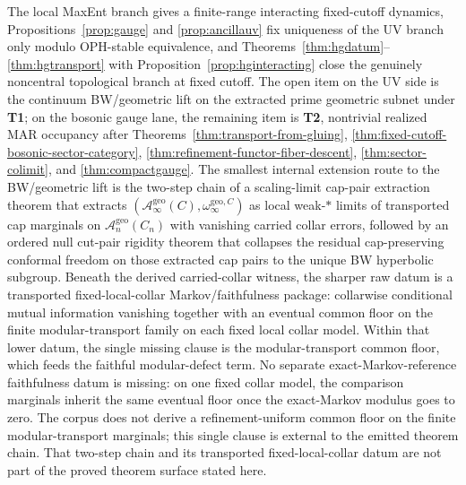 \documentclass[11pt]{article}
\begin{document}
The local MaxEnt branch gives a finite-range interacting fixed-cutoff dynamics, Propositions~\ref{prop:gauge} and \ref{prop:ancillauv} fix uniqueness of the UV branch only modulo OPH-stable equivalence, and Theorems~\ref{thm:hgdatum}--\ref{thm:hgtransport} with Proposition~\ref{prop:hginteracting} close the genuinely noncentral topological branch at fixed cutoff. The open item on the UV side is the continuum BW/geometric lift on the extracted prime geometric subnet under \textbf{T1}; on the bosonic gauge lane, the remaining item is \textbf{T2}, nontrivial realized MAR occupancy after Theorems~\ref{thm:transport-from-gluing}, \ref{thm:fixed-cutoff-bosonic-sector-category}, \ref{thm:refinement-functor-fiber-descent}, \ref{thm:sector-colimit}, and \ref{thm:compactgauge}. The smallest internal extension route to the BW/geometric lift is the two-step chain of a scaling-limit cap-pair extraction theorem that extracts \((\mathcal A_\infty^{\mathrm{geo}}(C),\omega_\infty^{\mathrm{geo},C})\) as local weak-\(*\) limits of transported cap marginals on \(\mathcal A_n^{\mathrm{geo}}(C_n)\) with vanishing carried collar errors, followed by an ordered null cut-pair rigidity theorem that collapses the residual cap-preserving conformal freedom on those extracted cap pairs to the unique BW hyperbolic subgroup. Beneath the derived carried-collar witness, the sharper raw datum is a transported fixed-local-collar Markov/faithfulness package: collarwise conditional mutual information vanishing together with an eventual common floor on the finite modular-transport family on each fixed local collar model. Within that lower datum, the single missing clause is the modular-transport common floor, which feeds the faithful modular-defect term. No separate exact-Markov-reference faithfulness datum is missing: on one fixed collar model, the comparison marginals inherit the same eventual floor once the exact-Markov modulus goes to zero. The corpus does not derive a refinement-uniform common floor on the finite modular-transport marginals; this single clause is external to the emitted theorem chain. That two-step chain and its transported fixed-local-collar datum are not part of the proved theorem surface stated here.
\end{document}
